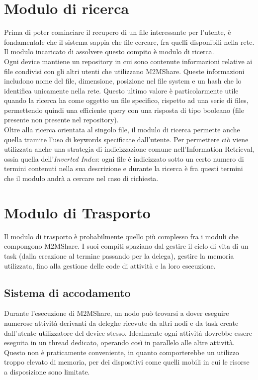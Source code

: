 \section{Modulo di ricerca}
Prima di poter cominciare il recupero di un file interessante per l'utente, \`{e} fondamentale che il sistema sappia che file cercare, fra quelli disponibili nella rete. Il modulo incaricato di assolvere questo compito \`{e} modulo di ricerca.
\\

Ogni device mantiene un repository in cui sono contenute informazioni relative ai file condivisi con gli altri utenti che utilizzano M2MShare. Queste informazioni includono nome del file, dimensione, posizione nel file system e un hash che lo identifica unicamente nella rete. Questo ultimo valore \`{e} particolarmente utile quando la ricerca ha come oggetto un file specifico, rispetto ad una serie di files, permettendo quindi una efficiente query con una risposta di tipo booleano (file presente \/ non presente nel repository).
\\
Oltre alla ricerca orientata al singolo file, il modulo di ricerca permette anche quella tramite l'uso di keywords specificate dall'utente. Per permettere ci\`{o} viene utilizzata anche una strategia di indicizzazione comune nell'Information Retrieval, ossia quella dell'\textit{Inverted Index}: ogni file \`{e} indicizzato sotto un certo numero di termini contenuti nella sua descrizione e durante la ricerca \`{e} fra questi termini che il modulo andrà a cercare nel caso di richiesta. 


\section{Modulo di Trasporto}
Il modulo di trasporto è probabilmente quello più complesso fra i moduli che compongono M2MShare. I suoi compiti spaziano dal gestire il ciclo di vita di un task (dalla creazione al termine passando per la delega), gestire la memoria utilizzata, fino alla gestione delle code di attività e la loro esecuzione.

\subsection{Sistema di accodamento}
Durante l'esecuzione di M2MShare, un nodo può trovarsi a dover eseguire numerose attività derivanti da deleghe ricevute da altri nodi e da task create dall'utente utilizzatore del device stesso. Idealmente ogni attività dovrebbe essere eseguita in un thread dedicato, operando così in parallelo alle altre attività. Questo non è praticamente conveniente, in quanto comporterebbe un utilizzo troppo elevato di memoria, per dei dispositivi come quelli mobili in cui le risorse a disposizione sono limitate. 
\\

